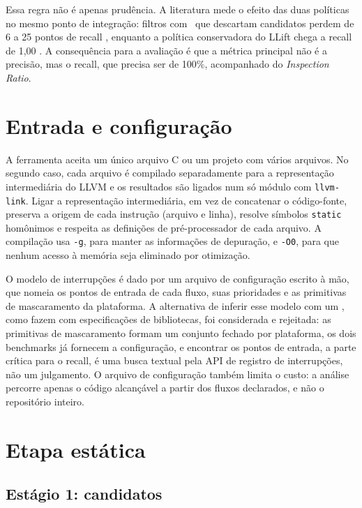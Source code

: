 Essa regra não é apenas prudência. A literatura mede o efeito das duas
políticas no mesmo ponto de integração: filtros com \llm\ que descartam
candidatos perdem de 6 a 25 pontos de recall \cite{reducing-fp,adataint},
enquanto a política conservadora do LLift chega a recall de 1,00
\cite{llift}. A consequência para a avaliação é que a métrica principal não é a
precisão, mas o recall, que precisa ser de 100\%, acompanhado do
\textit{Inspection Ratio}.

\section{Entrada e configuração}
\label{sec:entrada}

A ferramenta aceita um único arquivo C ou um projeto com vários arquivos. No
segundo caso, cada arquivo é compilado separadamente para a representação
intermediária do LLVM e os resultados são ligados num só módulo com
\texttt{llvm-link}. Ligar a representação intermediária, em vez de concatenar
o código-fonte, preserva a origem de cada instrução (arquivo e linha),
resolve símbolos \texttt{static} homônimos e respeita as definições de
pré-processador de cada arquivo. A compilação usa \texttt{-g}, para manter as
informações de depuração, e \texttt{-O0}, para que nenhum acesso à memória seja
eliminado por otimização.

O modelo de interrupções é dado por um arquivo de configuração escrito
à mão, que nomeia os pontos de entrada de cada fluxo, suas prioridades e as
primitivas de mascaramento da plataforma. A alternativa de inferir esse modelo
com um \llm, como  fazem com especificações de bibliotecas, foi
considerada e rejeitada: as primitivas de mascaramento formam um conjunto
fechado por plataforma, os dois benchmarks já fornecem a configuração, e
encontrar os pontos de entrada, a parte crítica para o recall, é uma busca
textual pela API de registro de interrupções, não um julgamento. O arquivo de
configuração também limita o custo: a análise percorre apenas o código
alcançável a partir dos fluxos declarados, e não o repositório inteiro.

\section{Etapa estática}
\label{sec:etapa-estatica}

\subsection{Estágio 1: candidatos}

